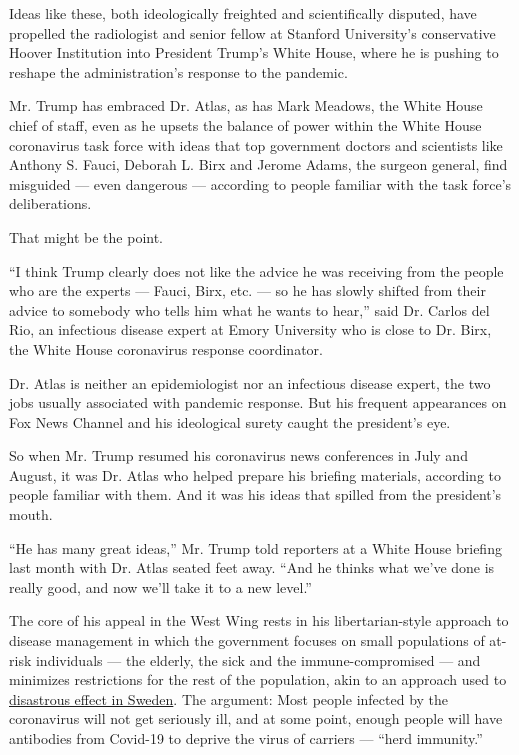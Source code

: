 Ideas like these, both ideologically freighted and scientifically
disputed, have propelled the radiologist and senior fellow at Stanford
University's conservative Hoover Institution into President Trump's
White House, where he is pushing to reshape the administration's
response to the pandemic.

Mr. Trump has embraced Dr. Atlas, as has Mark Meadows, the White House
chief of staff, even as he upsets the balance of power within the White
House coronavirus task force with ideas that top government doctors and
scientists like Anthony S. Fauci, Deborah L. Birx and Jerome Adams, the
surgeon general, find misguided --- even dangerous --- according to
people familiar with the task force's deliberations.

That might be the point.

``I think Trump clearly does not like the advice he was receiving from
the people who are the experts --- Fauci, Birx, etc. --- so he has
slowly shifted from their advice to somebody who tells him what he wants
to hear,'' said Dr. Carlos del Rio, an infectious disease expert at
Emory University who is close to Dr. Birx, the White House coronavirus
response coordinator.

Dr. Atlas is neither an epidemiologist nor an infectious disease expert,
the two jobs usually associated with pandemic response. But his frequent
appearances on Fox News Channel and his ideological surety caught the
president's eye.

So when Mr. Trump resumed his coronavirus news conferences in July and
August, it was Dr. Atlas who helped prepare his briefing materials,
according to people familiar with them. And it was his ideas that
spilled from the president's mouth.

``He has many great ideas,'' Mr. Trump told reporters at a White House
briefing last month with Dr. Atlas seated feet away. ``And he thinks
what we've done is really good, and now we'll take it to a new level.''

The core of his appeal in the West Wing rests in his libertarian-style
approach to disease management in which the government focuses on small
populations of at-risk individuals --- the elderly, the sick and the
immune-compromised --- and minimizes restrictions for the rest of the
population, akin to an approach used to
\href{https://www.nytimes3xbfgragh.onion/2020/07/07/business/sweden-economy-coronavirus.html}{disastrous
effect in Sweden}. The argument: Most people infected by the coronavirus
will not get seriously ill, and at some point, enough people will have
antibodies from Covid-19 to deprive the virus of carriers --- ``herd
immunity.''

